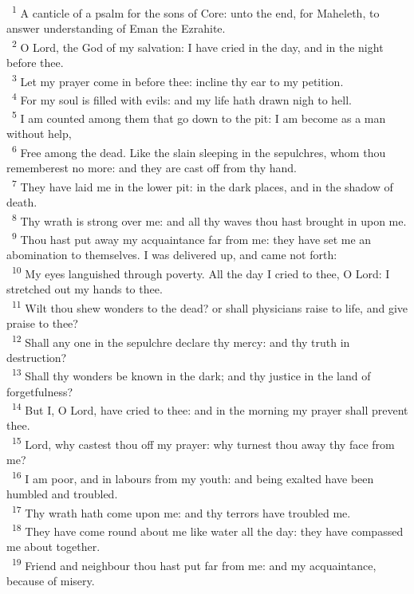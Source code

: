\documentclass[a5paper,12pt]{article}
\begin{document}
\begin{multicols*}{2}
~\textsuperscript{1} A canticle of a psalm for the sons of Core: unto the end, for Maheleth, to answer understanding of Eman the Ezrahite.\\
~\textsuperscript{2} O Lord, the God of my salvation: I have cried in the day, and in the night before thee.\\
~\textsuperscript{3} Let my prayer come in before thee: incline thy ear to my petition.\\
~\textsuperscript{4} For my soul is filled with evils: and my life hath drawn nigh to hell.\\
~\textsuperscript{5} I am counted among them that go down to the pit: I am become as a man without help,\\
~\textsuperscript{6} Free among the dead. Like the slain sleeping in the sepulchres, whom thou rememberest no more: and they are cast off from thy hand.\\
~\textsuperscript{7} They have laid me in the lower pit: in the dark places, and in the shadow of death.\\
~\textsuperscript{8} Thy wrath is strong over me: and all thy waves thou hast brought in upon me.\\
~\textsuperscript{9} Thou hast put away my acquaintance far from me: they have set me an abomination to themselves. I was delivered up, and came not forth:\\
~\textsuperscript{10} My eyes languished through poverty. All the day I cried to thee, O Lord: I stretched out my hands to thee.\\
~\textsuperscript{11} Wilt thou shew wonders to the dead? or shall physicians raise to life, and give praise to thee?\\
~\textsuperscript{12} Shall any one in the sepulchre declare thy mercy: and thy truth in destruction?\\
~\textsuperscript{13} Shall thy wonders be known in the dark; and thy justice in the land of forgetfulness?\\
~\textsuperscript{14} But I, O Lord, have cried to thee: and in the morning my prayer shall prevent thee.\\
~\textsuperscript{15} Lord, why castest thou off my prayer: why turnest thou away thy face from me?\\
~\textsuperscript{16} I am poor, and in labours from my youth: and being exalted have been humbled and troubled.\\
~\textsuperscript{17} Thy wrath hath come upon me: and thy terrors have troubled me.\\
~\textsuperscript{18} They have come round about me like water all the day: they have compassed me about together.\\
~\textsuperscript{19} Friend and neighbour thou hast put far from me: and my acquaintance, because of misery.\\


\end{multicols*}
\end{document}
